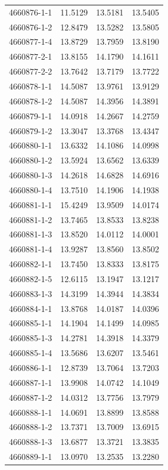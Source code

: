 \begin{longtable}{lrrr}
4660876-1-1 & 11.5129 & 13.5181 & 13.5405 \\
4660876-1-2 & 12.8479 & 13.5282 & 13.5805 \\
4660877-1-4 & 13.8729 & 13.7959 & 13.8190 \\
4660877-2-1 & 13.8155 & 14.1790 & 14.1611 \\
4660877-2-2 & 13.7642 & 13.7179 & 13.7722 \\
4660878-1-1 & 14.5087 & 13.9761 & 13.9129 \\
4660878-1-2 & 14.5087 & 14.3956 & 14.3891 \\
4660879-1-1 & 14.0918 & 14.2667 & 14.2759 \\
4660879-1-2 & 13.3047 & 13.3768 & 13.4347 \\
4660880-1-1 & 13.6332 & 14.1086 & 14.0998 \\
4660880-1-2 & 13.5924 & 13.6562 & 13.6339 \\
4660880-1-3 & 14.2618 & 14.6828 & 14.6916 \\
4660880-1-4 & 13.7510 & 14.1906 & 14.1938 \\
4660881-1-1 & 15.4249 & 13.9509 & 14.0174 \\
4660881-1-2 & 13.7465 & 13.8533 & 13.8238 \\
4660881-1-3 & 13.8520 & 14.0112 & 14.0001 \\
4660881-1-4 & 13.9287 & 13.8560 & 13.8502 \\
4660882-1-1 & 13.7450 & 13.8333 & 13.8175 \\
4660882-1-5 & 12.6115 & 13.1947 & 13.1217 \\
4660883-1-3 & 14.3199 & 14.3944 & 14.3834 \\
4660884-1-1 & 13.8768 & 14.0187 & 14.0396 \\
4660885-1-1 & 14.1904 & 14.1499 & 14.0985 \\
4660885-1-3 & 14.2781 & 14.3918 & 14.3379 \\
4660885-1-4 & 13.5686 & 13.6207 & 13.5461 \\
4660886-1-1 & 12.8739 & 13.7064 & 13.7203 \\
4660887-1-1 & 13.9908 & 14.0742 & 14.1049 \\
4660887-1-2 & 14.0312 & 13.7756 & 13.7979 \\
4660888-1-1 & 14.0691 & 13.8899 & 13.8588 \\
4660888-1-2 & 13.7371 & 13.7009 & 13.6915 \\
4660888-1-3 & 13.6877 & 13.3721 & 13.3835 \\
4660889-1-1 & 13.0970 & 13.2535 & 13.2280 \\

\end{longtable}
